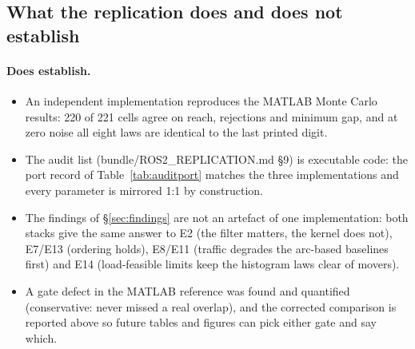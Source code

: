 \subsection{What the replication does and does not establish}

\paragraph{Does establish.}
\begin{itemize}[leftmargin=1.6em]
\item An independent implementation reproduces the MATLAB Monte Carlo
results: 220 of 221 cells agree on reach, rejections and minimum gap, and at
zero noise all eight laws are identical to the last printed digit.
\item The audit list (bundle/ROS2_REPLICATION.md \S9) is executable code:
the port record of Table~\ref{tab:auditport} matches the three implementations
and every parameter is mirrored 1:1 by construction.
\item The findings of \S\ref{sec:findings} are not an artefact of one
implementation: both stacks give the same answer to E2 (the filter matters,
the kernel does not), E7/E13 (ordering holds), E8/E11 (traffic degrades the
arc-based baselines first) and E14 (load-feasible limits keep the histogram
laws clear of movers).
\item A gate defect in the MATLAB reference was found and quantified
(conservative: never missed a real overlap), and the corrected comparison is
reported above so future tables and figures can pick either gate and say
which.
\end{itemize}


